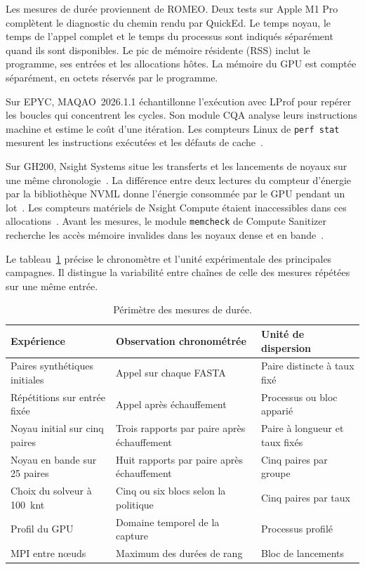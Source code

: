 Les mesures de durée proviennent de ROMEO. Deux tests sur Apple M1 Pro complètent le diagnostic du chemin rendu par QuickEd. Le temps noyau, le temps de l'appel complet et le temps du processus sont indiqués séparément quand ils sont disponibles. Le pic de mémoire résidente (RSS) inclut le programme, ses entrées et les allocations hôtes. La mémoire du GPU est comptée séparément, en octets réservés par le programme.

Sur EPYC, MAQAO~2026.1.1 échantillonne l’exécution avec LProf pour repérer les boucles qui concentrent les cycles. Son module CQA analyse leurs instructions machine et estime le coût d’une itération. Les compteurs Linux de \texttt{perf stat} mesurent les instructions exécutées et les défauts de cache~\cite{maqao,perfstat}.

Sur GH200, Nsight Systems situe les transferts et les lancements de noyaux sur une même chronologie~\cite{nsysdocs}. La différence entre deux lectures du compteur d’énergie par la bibliothèque NVML donne l’énergie consommée par le GPU pendant un lot~\cite{nvmldocs}. Les compteurs matériels de Nsight Compute étaient inaccessibles dans ces allocations~\cite{ncudocs}. Avant les mesures, le module \texttt{memcheck} de Compute Sanitizer recherche les accès mémoire invalides dans les noyaux dense et en bande~\cite{computesanitizer}.

Le tableau~\ref{tab:scope} précise le chronomètre et l'unité expérimentale des principales campagnes. Il distingue la variabilité entre chaînes de celle des mesures répétées sur une même entrée.
\begin{table}[!htbp]\centering\small
\caption{Périmètre des mesures de durée.}\label{tab:scope}
\begin{tabular}{@{}lll@{}}\toprule
Expérience & Observation chronométrée & Unité de dispersion \\\midrule
Paires synthétiques initiales & Appel sur chaque FASTA & Paire distincte à taux fixé \\
Répétitions sur entrée fixée & Appel après échauffement & Processus ou bloc apparié \\
Noyau initial sur cinq paires & Trois rapports par paire après échauffement & Paire à longueur et taux fixés \\
Noyau en bande sur 25 paires & Huit rapports par paire après échauffement & Cinq paires par groupe \\
Choix du solveur à 100~knt & Cinq ou six blocs selon la politique & Cinq paires par taux \\
Profil du GPU & Domaine temporel de la capture & Processus profilé \\
MPI entre nœuds & Maximum des durées de rang & Bloc de lancements \\\bottomrule
\end{tabular}\end{table}

